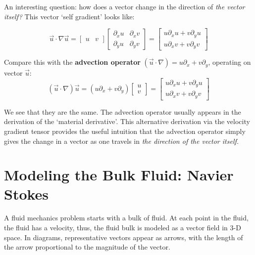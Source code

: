 \documentclass[a4paper]{report}
\begin{document}
\vspace*{2em}
An interesting question: how does a vector change in the direction of \emph{the vector itself?} This vector `self gradient' looks like:

\begin{equation}
\vec{u} \cdot \nabla \vec{u}
=
\begin{bmatrix}
u & v
\end{bmatrix}
\begin{bmatrix}
\partial_x u & \partial_x v \\
\partial_y u & \partial_y v
\end{bmatrix}
=
\begin{bmatrix}
u \partial_x u + v \partial_y u \\
u \partial_x v + v \partial_y v
\end{bmatrix}
\end{equation}


Compare this with the \textbf{advection operator}  $(\vec{u} \cdot \nabla ) = u \partial_x + v \partial_y $, operating on vector $\vec{u}$:
\begin{equation}
(\vec{u} \cdot \nabla ) \vec{u} = ( u \partial_x + v \partial_y )
\begin{bmatrix}
u \\ v
\end{bmatrix}
=
\begin{bmatrix}
u \partial_x u + v \partial_y u \\
u \partial_x v + v \partial_y v
\end{bmatrix}
\end{equation}

We see that they are the same.  The advection operator usually appears in the derivation of the `material derivative'.  This alternative derivation via the velocity gradient tensor provides the useful intuition that the advection operator simply gives the change in a vector as one travels in \emph{the direction of the vector itself.} 


\section*{Modeling the Bulk Fluid: Navier Stokes}

A fluid mechanics problem starts with a bulk of fluid.  At each point in the fluid, the fluid has a velocity, thus, the fluid bulk is modeled as a vector field in 3-D space.  In diagrams, representative vectors appear as arrows, with the length of the arrow proportional to the magnitude of the vector.
\end{document}
